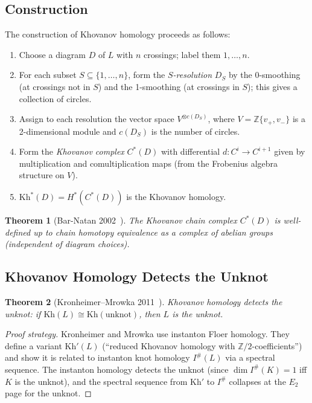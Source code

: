\documentclass[12pt,a4paper]{amsart}
\newtheorem{theorem}{Theorem}[section]
\theoremstyle{definition}
\theoremstyle{remark}
\newcommand{\Z}{\mathbb{Z}}
\begin{document}
\subsection{Construction}

The construction of Khovanov homology proceeds as follows:
\begin{enumerate}[label=\arabic*.]
\item Choose a diagram $D$ of $L$ with $n$ crossings; label them $1, \ldots, n$.
\item For each subset $S \subseteq \{1,\ldots,n\}$, form the \emph{$S$-resolution}
      $D_S$ by the 0-smoothing (at crossings not in $S$) and the
      1-smoothing (at crossings in $S$); this gives a collection of circles.
\item Assign to each resolution the vector space $V^{\otimes c(D_S)}$,
      where $V = \Z\{v_+, v_-\}$ is a 2-dimensional module and $c(D_S)$
      is the number of circles.
\item Form the \emph{Khovanov complex} $C^*(D)$ with differential
      $d \colon C^i \to C^{i+1}$ given by multiplication and
      comultiplication maps (from the Frobenius algebra structure on $V$).
\item $\mathrm{Kh}^*(D) = H^*(C^*(D))$ is the Khovanov homology.
\end{enumerate}

\begin{theorem}[Bar-Natan 2002~\cite{BarNatan2002}]
The Khovanov chain complex $C^*(D)$ is well-defined up to chain homotopy
equivalence as a complex of abelian groups (independent of diagram choices).
\end{theorem}

\subsection{Khovanov Homology Detects the Unknot}

\begin{theorem}[Kronheimer--Mrowka 2011~\cite{KronheimerMrowka2011}]
\label{thm:KM}
Khovanov homology detects the unknot: if $\mathrm{Kh}(L) \cong \mathrm{Kh}(\text{unknot})$,
then $L$ is the unknot.
\end{theorem}

\begin{proof}[Proof strategy]
Kronheimer and Mrowka use instanton Floer homology. They define a variant
$\mathrm{Kh}'(L)$ (``reduced Khovanov homology with $\Z/2$-coefficients'')
and show it is related to instanton knot homology $I^\#(L)$ via a spectral
sequence. The instanton homology detects the unknot (since $\dim I^\#(K) = 1$
iff $K$ is the unknot), and the spectral sequence from $\mathrm{Kh}'$ to $I^\#$
collapses at the $E_2$ page for the unknot.
\end{proof}
\end{document}
